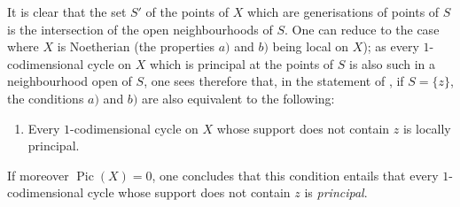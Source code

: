 It is clear that the set $S'$ of the points of $X$ which are generisations of points of $S$ is the intersection of the open neighbourhoods of $S$.
One can reduce to the case where $X$ is Noetherian (the properties $a)$ and $b)$ being local on $X$); as every $1$-codimensional cycle on $X$ which is principal at the points of $S$ is also such in a neighbourhood open of $S$, one sees therefore that, in the statement of , if $S=\{z\}$, the conditions $a)$ and $b)$ are also equivalent to the following:
\begin{enumerate}
  \item[c)] Every $1$-codimensional cycle on $X$ whose support does not contain $z$ is locally principal.
\end{enumerate}
If moreover $\operatorname{Pic}(X)=0$, one concludes that this condition entails that every $1$-codimensional cycle whose support does not contain $z$ is \emph{principal}.


